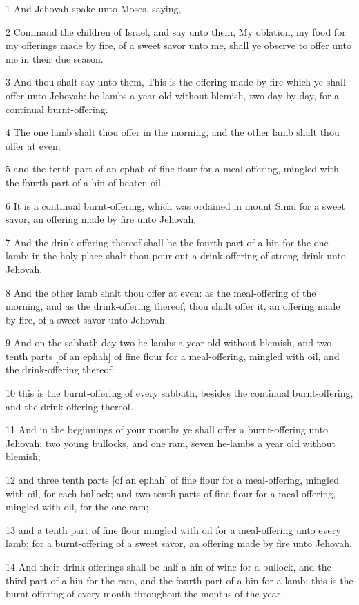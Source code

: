 \par 1 And Jehovah spake unto Moses, saying,
\par 2 Command the children of Israel, and say unto them, My oblation, my food for my offerings made by fire, of a sweet savor unto me, shall ye observe to offer unto me in their due season.
\par 3 And thou shalt say unto them, This is the offering made by fire which ye shall offer unto Jehovah: he-lambs a year old without blemish, two day by day, for a continual burnt-offering.
\par 4 The one lamb shalt thou offer in the morning, and the other lamb shalt thou offer at even;
\par 5 and the tenth part of an ephah of fine flour for a meal-offering, mingled with the fourth part of a hin of beaten oil.
\par 6 It is a continual burnt-offering, which was ordained in mount Sinai for a sweet savor, an offering made by fire unto Jehovah.
\par 7 And the drink-offering thereof shall be the fourth part of a hin for the one lamb: in the holy place shalt thou pour out a drink-offering of strong drink unto Jehovah.
\par 8 And the other lamb shalt thou offer at even: as the meal-offering of the morning, and as the drink-offering thereof, thou shalt offer it, an offering made by fire, of a sweet savor unto Jehovah.
\par 9 And on the sabbath day two he-lambs a year old without blemish, and two tenth parts [of an ephah] of fine flour for a meal-offering, mingled with oil, and the drink-offering thereof:
\par 10 this is the burnt-offering of every sabbath, besides the continual burnt-offering, and the drink-offering thereof.
\par 11 And in the beginnings of your months ye shall offer a burnt-offering unto Jehovah: two young bullocks, and one ram, seven he-lambs a year old without blemish;
\par 12 and three tenth parts [of an ephah] of fine flour for a meal-offering, mingled with oil, for each bullock; and two tenth parts of fine flour for a meal-offering, mingled with oil, for the one ram;
\par 13 and a tenth part of fine flour mingled with oil for a meal-offering unto every lamb; for a burnt-offering of a sweet savor, an offering made by fire unto Jehovah.
\par 14 And their drink-offerings shall be half a hin of wine for a bullock, and the third part of a hin for the ram, and the fourth part of a hin for a lamb: this is the burnt-offering of every month throughout the months of the year.
